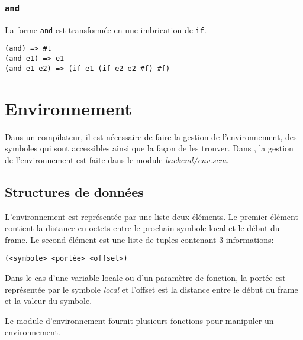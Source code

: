 \documentclass[11pt]{report}
\begin{document}
\subsection{\tt and}

La forme {\tt and} est transformée en une imbrication de {\tt if}.


\begin{verbatim}
(and) => #t
(and e1) => e1
(and e1 e2) => (if e1 (if e2 e2 #f) #f)
\end{verbatim}



\chapter{Environnement}

Dans un compilateur, il est nécessaire de faire la gestion de
l'environnement, des symboles qui sont accessibles ainsi que la façon
de les trouver.  Dans \sins{}, la gestion de l'environnement est
faite dans le module {\it backend/env.scm}.

\section{Structures de données}

L'environnement est représentée par une liste deux éléments. Le
premier élément contient la distance en octets entre le prochain
symbole local et le début du frame.  Le second élément est une liste
de tuples contenant 3 informations:


\begin{verbatim}
(<symbole> <portée> <offset>)
\end{verbatim}

Dans le cas d'une variable locale ou d'un paramètre de fonction, la
portée est représentée par le symbole {\it local} et l'offset est la
distance entre le début du frame et la valeur du symbole.

Le module d'environnement fournit plusieurs fonctions pour manipuler
un environnement.
\end{document}
